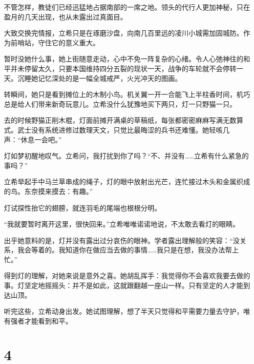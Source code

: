 \documentclass{article}
\begin{document}
不管怎样，教徒们已经迅猛地占据南部的一席之地。领头的代行人更加神秘，只在盈月的几天出现，也从未露出过真面目。



大致交换完情报，立希只是在琢磨沙盘，向南几百里远的凌川小城需加固城防。作为前哨站，守住它的意义重大。



暂时没她什么事，她上街随意走动，心中不免一阵复杂的心绪。令人心弛神往的和平并未停留太久，只要本国维持四分五裂的现状一天，战争的车轮就不会停转一天。沉睡她记忆深处的是一幅全城戒严，火光冲天的图画。



转瞬间，她只是看到摊位上的木制小鸟。机关翼一开一合能飞上半柱香时间，机巧总是给人们带来新奇玩意儿。立希没什么犹豫地买下两只，灯一只野猫一只。



去的时候野猫正削木棍，灯面前摊开满桌的草稿纸，每张都密密麻麻写满无数算式。武士没有系统进修过数理天文，只觉比最晦涩的兵书还难懂。她轻咳几声：“休息一会吧。”



灯如梦初醒地叹气。立希问，我打扰到你了吗？“不、并没有……立希有什么紧急的事吗？”



立希举起手中马兰草串成的绳子，灯的眼中放射出光芒，连忙接过木头和金属织成的鸟。东奈摸来摸去：有趣。”



灯试探性抬它的翅膀，就连羽毛的尾端也根根分明。



“我就要暂时离开这里，很快回来。”立希唯唯诺诺地说，不太敢去看灯的眼睛。



出乎她意料的是，灯并没有露出过分哀伤的眼神。学者露出理解般的笑容：“没关系，我会等着的。我知道你在做应当去做的事情……我只是在想，我没办法帮上忙。”



得到灯的理解，对她来说是意外之喜。她胡乱挥手：我觉得你不会喜欢我要去做的事。灯坚定地摇摇头：并不是如此，这就跟翻越一座山一样。只有坚定的人才能到达山顶。



听完这些，立希动身出发。她试图理解，想了半天只觉得和平需要力量去守护，唯有强者才能看到和平。





{\centering\section*{4}}
\end{document}
